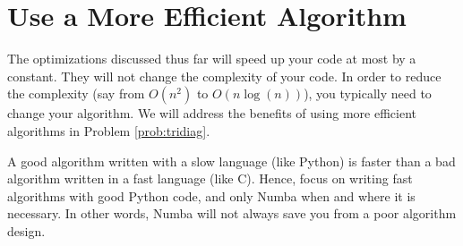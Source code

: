 \section*{Use a More Efficient Algorithm} %

The optimizations discussed thus far will speed up your code at most by a constant.
They will not change the complexity of your code.
In order to reduce the complexity (say from $O(n^2)$ to $O(n \log(n))$), you typically need to change your algorithm.
We will address the benefits of using more efficient algorithms in Problem \ref{prob:tridiag}.

A good algorithm written with a slow language (like Python) is faster than a bad algorithm written in a fast language (like C).
Hence, focus on writing fast algorithms with good Python code, and only Numba when and where it is necessary.
In other words, Numba will not always save you from a poor algorithm design.

\begin{comment}
\begin{problem}
Optimize the following function using techniques described in this lab:
\begin{lstlisting}
# TODO: COME UP WITH SOME ALGORITHM TO DO HERE!!
\end{lstlisting}
It should also include a list of changes, the reasoning behind the changes, and the effect of the changes on runtime.
On the author's computer, computing the LU-decomposition on a 1000x1000 matrix took over 2 and a half minutes.
The optimized version took a little over a second.

Hint: The best way to approach this problem is to analyze what each piece of code is actually doing.
Then, determine if there is a more efficient way to accomplish the same task.
Specifically, look for ways to use array operations instead of for loops, ways to replace blocks of code with built-in Python functions, and ways to avoid recomputing values.
\end{problem}
\end{comment}

